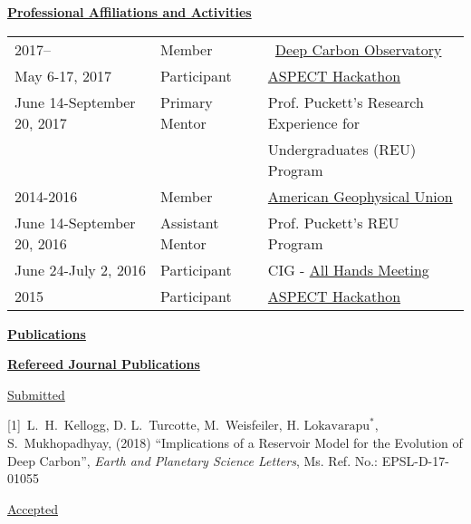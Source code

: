 \documentclass[11pt]{ltxdoc}
\begin{document}
\newpage

\vskip 12pt

\begin{center}
	\textbf{\underline{Professional Affiliations and Activities}}
\end{center}

\vskip -06pt

\addtolength{\tabcolsep}{15pt}   
\begin{tabular}{lll}
  2017--     & Member & ~\href{https://deepcarbon.net/}{Deep Carbon Observatory} \\[06pt]
  May 6-17, 2017 & Participant & \href{https://geodynamics.org/cig/events/calendar/2017-aspect-hack/}{ASPECT Hackathon} \\[06pt]
  June 14-September 20, 2017 & Primary Mentor & Prof. Puckett's Research Experience for\\
                             &                & Undergraduates (REU) Program\\[06pt]
  2014-2016     & Member & 
 \href{ https://sites.agu.org}{ American Geophysical Union } \\[06pt]
  June 14-September 20, 2016 & Assistant Mentor & Prof. Puckett's REU Program \\[06pt]
  June 24-July 2, 2016     & Participant & CIG - \href{https://geodynamics.org/cig/events/calendar/2016-cig-all-hands-meeting/}{All Hands Meeting} \\[06pt]
  2015     & Participant & \href{https://geodynamics.org/cig/events/calendar/2016-cig-all-hands-meeting/2016-aspect-hack/?eID=1233}{ASPECT Hackathon}\\[06pt]
  

\end{tabular}
\addtolength{\tabcolsep}{1pt}  


\begin{center}
  \textbf{\underline{Publications}}
\end{center}

\noindent
\textbf{\underline{Refereed Journal Publications}}


\noindent
\underline{Submitted}

\hangindent 20pt
[1]~L.~H.~Kellogg, D. L.~Turcotte, M.~Weisfeiler, $\textrm{H.~Lokavarapu}^*$, S.~Mukhopadhyay, (2018) 
``Implications of a Reservoir Model for the
Evolution of Deep Carbon'', 
\textit{Earth and Planetary Science Letters}, Ms. Ref. No.:  EPSL-D-17-01055

\noindent
\underline{Accepted}
\end{document}
